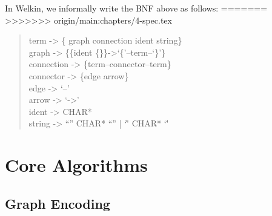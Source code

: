 In Welkin, we informally write the BNF above as follows:
=======
>>>>>>> origin/main:chapters/4-spec.tex
\begin{quote}{\ttfamily \raggedright \noindent
	term -> \{ graph connection ident string\}\\
	graph -> \{\{ident \{\}\}->`\{'--term--`\}'\}\\
	connection -> \{term--connector--term\}\\
	connector -> \{edge arrow\}\\
	edge -> `--'\\
	arrow -> `->'\\
	ident -> CHAR*\\
	string -> ``'' CHAR* ``'' | `\`' CHAR* `\''
}\end{quote}

\section{Core Algorithms}

\subsection{Graph Encoding}



\label{ch:spec}
